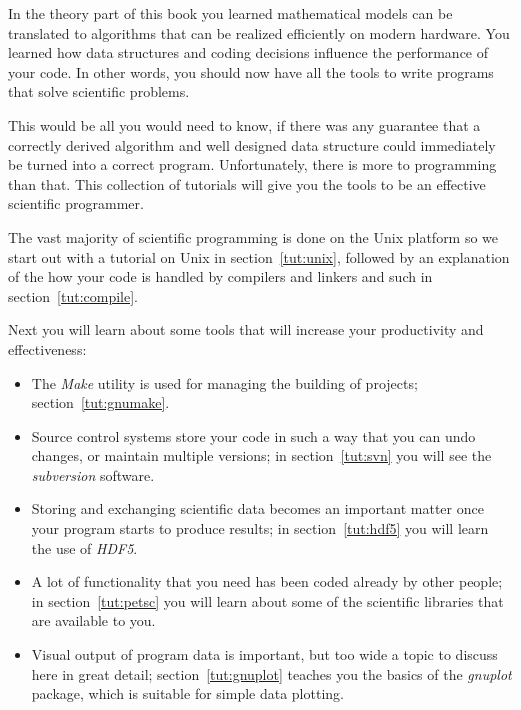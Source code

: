 
In the theory part of this book you learned mathematical models can be
translated to algorithms that can be realized efficiently on modern
hardware. You learned how data structures and coding decisions
influence the performance of your code. In other words, you should now
have all the tools to write programs that solve scientific problems.

This would be all you would need to know,
if there was any guarantee that a correctly derived algorithm and
well designed data structure could immediately be turned into a
correct program.
Unfortunately, there is more to programming than that. This collection
of tutorials will give you the tools to be an effective scientific
programmer.

The vast majority of
scientific programming is done on the Unix platform so we start out
with a tutorial on Unix in section~\ref{tut:unix}, followed by an
explanation of the how your code is handled by compilers and linkers
and such in section~\ref{tut:compile}.

Next you will learn about some tools that will increase your
productivity and effectiveness: 
\begin{itemize}
\item The \emph{Make} utility is used for managing the building of
  projects; section~\ref{tut:gnumake}.
\item Source control systems store your code in such a way that you
  can undo changes, or maintain multiple versions; in
  section~\ref{tut:svn} you will see the \emph{subversion} software.
\item Storing and exchanging scientific data becomes an important
  matter once your program starts to produce results; in
  section~\ref{tut:hdf5} you will learn the use of \emph{HDF5}.
\item A lot of functionality that you need has been coded already by
  other people; in section~\ref{tut:petsc} you will learn about some
  of the scientific libraries that are available to you.
\item Visual output of program data is important, but too wide a topic
  to discuss here in great detail; section~\ref{tut:gnuplot} teaches
  you the basics of the \emph{gnuplot} package, which is suitable for
  simple data plotting.
\end{itemize}

